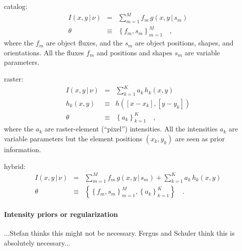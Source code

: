 \documentclass[12pt]{article}
\newcommand{\set}[1]{\left\{{#1}\right\}}
\newcommand{\given}{\,|\,}
\begin{document}
catalog:
\begin{eqnarray}
I(x,y\given\nu) &=& \sum_{m=1}^M f_m\,g(x,y\given s_m)
\\
\theta &\equiv& \set{f_m, s_m}_{m=1}^M
\quad,
\end{eqnarray}
where the $f_m$ are object fluxes, and the $s_m$ are object positions,
shapes, and orientations.  All the fluxes $f_m$ and positions and
shapes $s_m$ are variable parameters.

raster:
\begin{eqnarray}
I(x,y\given\nu) &=& \sum_{k=1}^K a_k\,h_k(x, y)
\\
h_k(x, y) &\equiv& h([x-x_k], [y-y_k])
\\
\theta &\equiv& \set{a_k}_{k=1}^K
\quad,
\end{eqnarray}
where the $a_k$ are raster-element (``pixel'') intensities.  All the
intensities $a_k$ are variable parameters but the element positions
$(x_k, y_k)$ are seen as prior information.

hybrid:
\begin{eqnarray}
I(x,y\given\nu) &=& \sum_{m=1}^M f_m\,g(x,y\given s_m)
                  + \sum_{k=1}^K a_k\,h_k(x, y)
\\
\theta &\equiv& \set{\set{f_m, s_m}_{m=1}^M, \set{a_k}_{k=1}^K}
\quad.
\end{eqnarray}

\paragraph{Intensity priors or regularization}

...Stefan thinks this might not be necessary.  Fergus and Schuler
think this is absolutely necessary...
\end{document}
